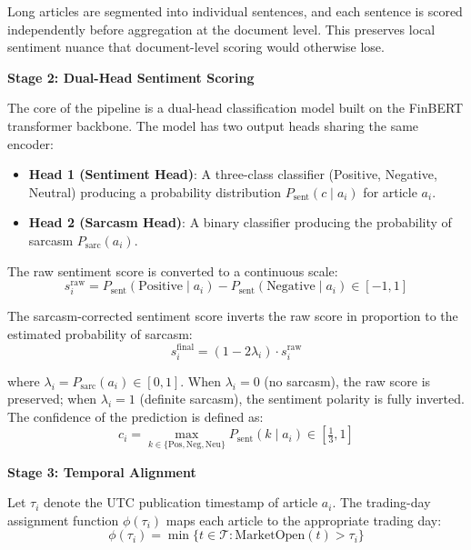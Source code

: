 \documentclass[12pt,a4paper]{article}
\begin{document}
Long articles are segmented into individual sentences, and each sentence is scored independently before aggregation at the document level. This preserves local sentiment nuance that document-level scoring would otherwise lose.

\textbf{Stage 2: Dual-Head Sentiment Scoring}

The core of the pipeline is a dual-head classification model built on the FinBERT transformer backbone. The model has two output heads sharing the same encoder:
\begin{itemize}
    \item \textbf{Head 1 (Sentiment Head)}: A three-class classifier (Positive, Negative, Neutral) producing a probability distribution $P_{\text{sent}}(c \mid a_i)$ for article $a_i$.
    \item \textbf{Head 2 (Sarcasm Head)}: A binary classifier producing the probability of sarcasm $P_{\text{sarc}}(a_i)$.
\end{itemize}

The raw sentiment score is converted to a continuous scale:
\begin{equation}
s_i^{\text{raw}} = P_{\text{sent}}(\text{Positive} \mid a_i) - P_{\text{sent}}(\text{Negative} \mid a_i) \in [-1, 1]
\end{equation}

The sarcasm-corrected sentiment score inverts the raw score in proportion to the estimated probability of sarcasm:
\begin{equation}
s_i^{\text{final}} = (1 - 2\lambda_i) \cdot s_i^{\text{raw}}
\end{equation}

where $\lambda_i = P_{\text{sarc}}(a_i) \in [0, 1]$. When $\lambda_i = 0$ (no sarcasm), the raw score is preserved; when $\lambda_i = 1$ (definite sarcasm), the sentiment polarity is fully inverted. The confidence of the prediction is defined as:
\begin{equation}
c_i = \max_{k \in \{\text{Pos}, \text{Neg}, \text{Neu}\}} P_{\text{sent}}(k \mid a_i) \in \left[\tfrac{1}{3}, 1\right]
\end{equation}

\textbf{Stage 3: Temporal Alignment}

Let $\tau_i$ denote the UTC publication timestamp of article $a_i$. The trading-day assignment function $\phi(\tau_i)$ maps each article to the appropriate trading day:
\begin{equation}
\phi(\tau_i) = \min\{t \in \mathcal{T} : \text{MarketOpen}(t) > \tau_i\}
\end{equation}
\end{document}
